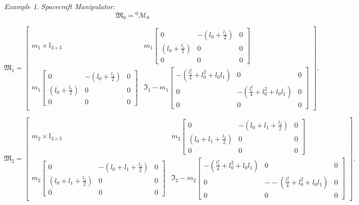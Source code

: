 \documentclass[lettersize,journal]{IEEEtran}
\theoremstyle{remark}
\newtheorem{example}{Example}[subsection]
\begin{document}
\begin{example}{ \textit{Spacecraft Manipulator:}}
\begin{equation*}
    \mathfrak{M}_0={}^0\mathcal{M}_0
\end{equation*}

\begin{strip}
\begin{equation*}
    \mathfrak{M}_1=\begin{bmatrix}
    m_1\times \mathbb{I}_{3\times 3} & m_1\begin{bmatrix}
    0 &-(l_0+\frac{l_1}{2}) & 0\\(l_0+\frac{l_1}{2}) & 0&0 \\0 &0 &0
    \end{bmatrix}\\ m_1\begin{bmatrix}
    0 &-(l_0+\frac{l_1}{2}) & 0\\(l_0+\frac{l_1}{2}) & 0&0 \\0 &0 &0
    \end{bmatrix}& \mathfrak{I}_1-m_1\begin{bmatrix}
    -(\frac{l_1^2}{4}+l_0^2+l_0l_1) & 0 & 0\\0 & -(\frac{l_1^2}{4}+l_0^2+l_0l_1)& 0\\ 0 & 0 & 0
    \end{bmatrix}
    \end{bmatrix}.
\end{equation*}

\begin{equation*}
    \mathfrak{M}_2=\begin{bmatrix}
    m_2\times \mathbb{I}_{3\times 3} & m_2\begin{bmatrix}
    0 &-(l_0+l_1+\frac{l_2}{2}) & 0\\(l_0+l_1+\frac{l_2}{2}) & 0&0 \\0 &0 &0
    \end{bmatrix}\\ m_2\begin{bmatrix}
    0 &-(l_0+l_1+\frac{l_2}{2}) & 0\\(l_0+l_1+\frac{l_2}{2}) & 0&0 \\0 &0 &0
    \end{bmatrix}& \mathfrak{I}_2-m_2\begin{bmatrix}
    -(\frac{l_1^2}{4}+l_0^2+l_0l_1) & 0 & 0\\0 & - -(\frac{l_1^2}{4}+l_0^2+l_0l_1)& 0\\ 0 & 0 & 0
    \end{bmatrix}
    \end{bmatrix}.
\end{equation*}
\end{strip}





\end{example}
\end{document}

